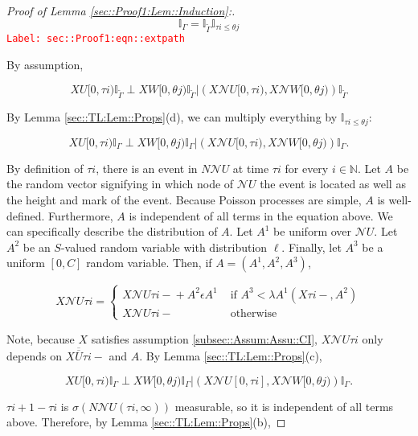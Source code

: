 \documentclass[12pt]{article}
\newcommand{\mb}{\mathbb}
\newcommand{\mc}{\mathcal}
\newcommand{\ov}{\overline}
\newcommand{\te}{\text}
\newcommand{\ep}{\epsilon}
\newcommand{\tr}{\textcolor{red}}
\newcommand{\labe}[1]{\tr{\texttt{Label: #1}}}
\renewcommand{\U}{U}							%
\newcommand{\UU}{W}								%
\renewcommand{\S}{S}							%
\newcommand{\ev}{\ep}							%
\newcommand{\X}{X}								%
\newcommand{\neigh}{\mc{N}}						%
\newcommand{\cl}{\ov}							%
\newcommand{\const}{C}							%
\newcommand{\poiss}{N}							%
\newcommand{\Sm}{\ell}							%
\newcommand{\rate}{\lambda}						%
\newcommand{\alt}[1]{\widetilde{#1}}			%
\newcommand{\rt}{\tau}							%
\newcommand{\rtt}{\theta}						%
\newcommand{\apath}{\Gamma}						%
\newcommand{\rv}{A}								%
\begin{document}
\begin{proof}[Proof of Lemma \ref{sec::Proof1:Lem::Induction}:]
\begin{equation}
\mb{I}_{\apath} = \mb{I}_{\alt{\apath}}\mb{I}_{\rt{i} \leq \rtt{j}}
\label{sec::Proof1:eqn::extpath}
\end{equation}
\labe{sec::Proof1:eqn::extpath}

By assumption,

\[\X{\U}{[0,\rt{i})}\mb{I}_{\alt{\apath}}\perp \X{\UU}{[0,\rtt{j})}\mb{I}_{\alt{\apath}}|\left(\X{\neigh{\U}}{[0,\rt{i})},\X{\neigh{\UU}}{[0,\rtt{j})}\right)\mb{I}_{\alt{\apath}}\]

By Lemma \ref{sec::TL:Lem::Props}(d), we can multiply everything by \(\mb{I}_{\rt{i} \leq \rtt{j}}\):

\[\X{\U}{[0,\rt{i})}\mb{I}_{\apath}\perp \X{\UU}{[0,\rtt{j})}\mb{I}_{\apath}|\left(\X{\neigh{\U}}{[0,\rt{i})},\X{\neigh{\UU}}{[0,\rtt{j})}\right)\mb{I}_{\apath}.\]

By definition of \(\rt{i}\), there is an event in \(\poiss{\neigh{\U}}\) at time \(\rt{i}\) for every \(i \in \mb{ N}\). Let \(\rv\) be the random vector signifying in which node of \(\neigh{\U}\) the event is located as well as the height and mark of the event. Because Poisson processes are simple, \(\rv\) is well-defined. Furthermore, \(\rv\) is independent of all terms in the equation above. We can specifically describe the distribution of \(\rv\). Let \(\rv^1\) be uniform over \(\neigh{\U}\). Let \(\rv^2\) be an \(\S\)-valued random variable with distribution \(\Sm\). Finally, let \(\rv^3\) be a uniform \([0,\const{}]\) random variable. Then, if \(\rv=(\rv^1,\rv^2,\rv^3)\),

\[\X{\neigh{\U}}{\rt{i}} = \begin{cases}
\X{\neigh{\U}}{\rt{i}-} + \rv^2\ev{\rv^1} &\te{ if } \rv^3< \rate{\rv^1}(\X{}{\rt{i}-}, \rv^2)\\
\X{\neigh{\U}}{\rt{i}-} &\te{ otherwise}
\end{cases}\]

Note, because \(\X{}{}\) satisfies assumption \ref{subsec::Assum:Assu::CI}, \(\X{\neigh{\U}}{\rt{i}}\) only depends on \(\X{\cl{\cl{\U}}}{\rt{i}-}\) and \(\rv\). By Lemma \ref{sec::TL:Lem::Props}(c), 

\[\X{\U}{[0,\rt{i})}\mb{I}_{\apath}\perp \X{\UU}{[0,\rtt{j})}\mb{I}_{\apath}|\left(\X{\neigh{\U}}{[0,\rt{i}]},\X{\neigh{\UU}}{[0,\rtt{j})}\right)\mb{I}_{\apath}.\]

\(\rt{i+1} - \rt{i}\) is \(\sigma(\poiss{\neigh{\U}}(\rt{i},\infty))\) measurable, so it is independent of all terms above. Therefore, by Lemma \ref{sec::TL:Lem::Props}(b),


\end{proof}
\end{document}
